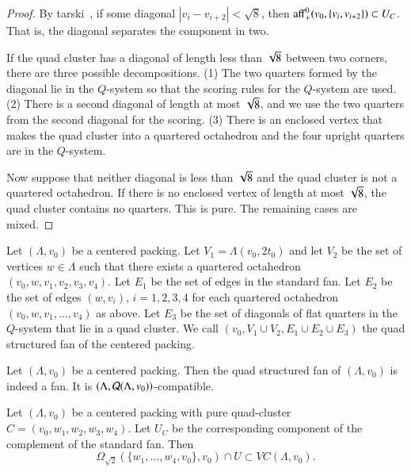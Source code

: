 \begin{proof}
By tarski~, if some diagonal $|v_i-v_{i+2}|<\sqrt8$,
then ${\operatorname{aff}}_+^0(v_0,\{v_i,v_{i+2}\})\subset U_C$. That is, the
diagonal separates the component in two.

If the quad cluster has a diagonal of length less than $\sqrt8$
between two corners, there are three possible decompositions. (1)
The two quarters formed by the diagonal lie in the $Q$-system so
that the scoring rules for the $Q$-system are used.  (2) There is
a second diagonal of length at most $\sqrt8$, and we use the two
quarters from the second diagonal for the scoring. (3) There is an
enclosed vertex that makes the quad cluster into a quartered
octahedron and the four upright quarters are in the $Q$-system.

Now suppose that neither diagonal is less than $\sqrt8$ and the
quad cluster is not a quartered octahedron. If there is no
enclosed vertex of length at most $\sqrt8$, the quad cluster
contains no quarters. This is pure.
The remaining cases are mixed.
\end{proof}





\begin{definition}
Let $(\Lambda,v_0)$ be a centered packing.   Let $V_1 = \Lambda(v_0,2t_0)$
and let $V_2$ be the set of vertices $w\in  \Lambda$ such that there
exists a quartered octahedron $(v_0,w,v_1,v_2,v_3,v_4)$.  Let $E_1$
be the set of edges in the standard fan.  Let $E_2$ be the set of
edges $(w,v_i)$, $i=1,2,3,4$ for each quartered octahedron $(v_0,w,v_1,\ldots,v_4)$ as above.  Let $E_3$ be the set of diagonals of flat quarters in
the $Q$-system that lie in a quad cluster.  
We call $(v_0,V_1\cup V_2,E_1\cup E_2 \cup E_3)$ the quad structured fan of the centered packing.
\end{definition}


\begin{lemma}
Let $(\Lambda,v_0)$ be a centered packing.  Then the quad structured fan
of $(\Lambda,v_0)$ is indeed a fan.  
It is $(\Lambda,{\mathcal Q}(\Lambda,v_0))$-compatible.
\end{lemma}

\begin{lemma}
Let $(\Lambda,v_0)$ be a centered packing with pure quad-cluster $C=(v_0,w_1,w_2,w_3,w_4)$.  Let $U_C$ be the corresponding component of the complement of the standard fan.  Then
  $$
  \Omega_{\sqrt2}(\{w_1,\ldots,w_4,v_0\},v_0) \cap U \subset 
  VC(\Lambda,v_0).
  $$
\end{lemma}

